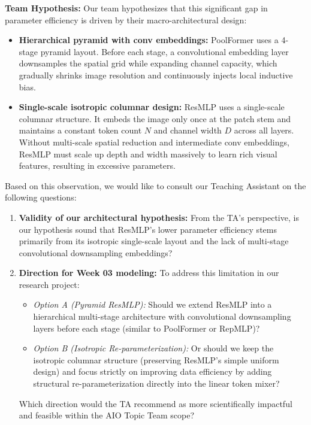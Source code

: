 \textbf{Team Hypothesis:} Our team hypothesizes that this significant gap in parameter efficiency is driven by their macro-architectural design:
\begin{itemize}[leftmargin=1.5em]
    \item \textbf{Hierarchical pyramid with conv embeddings:} PoolFormer uses a 4-stage pyramid layout. Before each stage, a convolutional embedding layer downsamples the spatial grid while expanding channel capacity, which gradually shrinks image resolution and continuously injects local inductive bias.
    \item \textbf{Single-scale isotropic columnar design:} ResMLP uses a single-scale columnar structure. It embeds the image only once at the patch stem and maintains a constant token count $N$ and channel width $D$ across all layers. Without multi-scale spatial reduction and intermediate conv embeddings, ResMLP must scale up depth and width massively to learn rich visual features, resulting in excessive parameters.
\end{itemize}

Based on this observation, we would like to consult our Teaching Assistant on the following questions:
\begin{enumerate}[label=\textbf{Q\arabic*:}]
    \item \textbf{Validity of our architectural hypothesis:} From the TA's perspective, is our hypothesis sound that ResMLP's lower parameter efficiency stems primarily from its isotropic single-scale layout and the lack of multi-stage convolutional downsampling embeddings?
    \item \textbf{Direction for Week 03 modeling:} To address this limitation in our research project:
    \begin{itemize}
        \item \textit{Option A (Pyramid ResMLP):} Should we extend ResMLP into a hierarchical multi-stage architecture with convolutional downsampling layers before each stage (similar to PoolFormer or RepMLP)?
        \item \textit{Option B (Isotropic Re-parameterization):} Or should we keep the isotropic columnar structure (preserving ResMLP's simple uniform design) and focus strictly on improving data efficiency by adding structural re-parameterization directly into the linear token mixer?
    \end{itemize}
    Which direction would the TA recommend as more scientifically impactful and feasible within the AIO Topic Team scope?
\end{enumerate}
